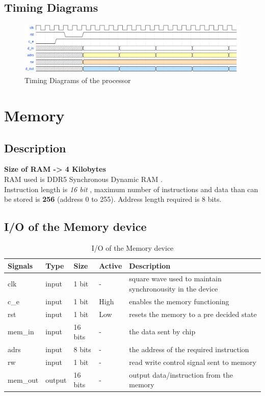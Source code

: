 \documentclass[11pt]{article}
\begin{document}
\subsection{Timing Diagrams}
\begin{figure}[!h]
  \caption{Timing Diagrams of the processor}
  \includegraphics[scale=0.2]{timing_diag.jpg}
\end{figure}
\section{Memory}
\subsection{Description}
{\bf Size of RAM -> 4 Kilobytes} \\
RAM used is DDR5 Synchronous Dynamic RAM . \\
Instruction length is \textit{16 bit} , maximum number of instructions  and data than can be stored is {\bf 256} (address 0 to 255).
Address length required is 8 bits.
\subsection{I/O of the  Memory device}

\begin{table}[H]
  \begin{center}
    \caption{I/O of the Memory device}
    \begin{tabularx}{\linewidth}{||l|l|l|l|X||}
      \hline
      {\bf Signals} & { \bf Type } & {\bf Size} & {\bf Active} &{\bf Description}   \\ \hline
            clk            & input  & 1 bit   & -     &  square wave used to maintain synchronousity in the device \\ \hline
            c\_e           & input  & 1 bit   & High  &  enables the memory functioning  \\ \hline
            rst            & input  & 1 bit   & Low   &  resets the memory to a pre decided state \\ \hline
            [15:0] mem\_in & input  & 16 bits & -     &  the data sent by chip \\ \hline
            [7:0] adrs     & input  & 8 bits  & -     &  the address of the required instruction \\ \hline
            rw             & input  & 1 bit   & -     &  read write control signal sent to memory \\ \hline
            [15:0] mem\_out& output & 16 bits & -     &  output data/instruction from the memory \\ \hline
    \end{tabularx}
  \end{center}
\end{table}
\end{document}
